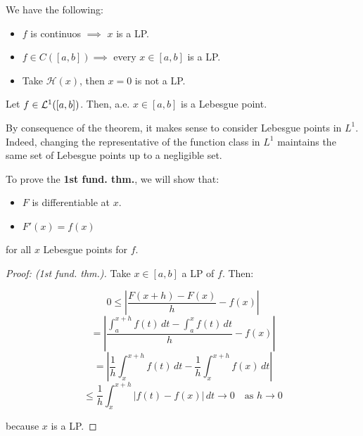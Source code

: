 \vspace{1em}

\begin{fremark}
    We have the following:
    \vspace{1em}
    \begin{itemize}
        \item $f$ is continuos $\implies$ $x$ is a LP.
        \vspace{1em}
        \item $f \in C([a, b]) \implies$ every $x \in [a, b]$ is a LP.
        \vspace{1em}
        \item Take $\mathcal{H}(x)$, then $x = 0$ is not a LP.
    \end{itemize}
\end{fremark}

\vspace{1em}

\begin{ftheorem}[Lebesgue]
    Let $f \in \mathcal{L}^1([a, b])$. Then, a.e. $x \in [a, b]$ is a Lebesgue point.
\end{ftheorem}

\begin{fremark}
    By consequence of the theorem, it makes sense to consider Lebesgue points in 
    $L^1$. Indeed, changing the representative of the function class in
    $L^1$ maintains the same set of Lebesgue points up to a negligible set.
\end{fremark}

\vspace{1em}

\begin{note}
    To prove the \textbf{1st fund. thm.}, we will show that:
    \begin{itemize}
        \item $F$ is differentiable at $x$.
        \item $F'(x) = f(x)$
    \end{itemize}

    for all $x$ Lebesgue points for $f$.
\end{note}

\vspace{1em}

\begin{proof}[Proof: (1st fund. thm.)]
    Take $x \in [a, b]$ a LP of $f$. Then:

    $$ 0 \leq \left| \frac{F(x+h) - F(x)}{h} - f(x)\right| $$
    $$= \left| \frac{\int_a^{x+h} f(t) \, dt - \int_a^x f(t) \, dt}{h} - f(x) \right|$$
    $$= \left| \frac{1}{h} \int_x^{x+h} f(t) \, dt - \frac{1}{h} \int_x^{x+h} f(x) \, dt \right|$$
    $$\leq \frac{1}{h} \int_x^{x+h} |f(t) - f(x)| \, dt \to 0 \quad \text{as } h \to 0$$

    because $x$ is a LP.

\end{proof}

